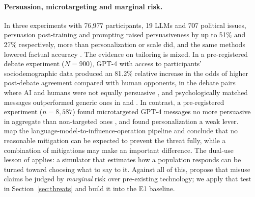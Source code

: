 \documentclass[11pt]{article}
\begin{document}
\paragraph{Persuasion, microtargeting and marginal risk.} In three experiments with 76,977 participants, 19 LLMs and 707 political issues, persuasion post-training and prompting raised persuasiveness by up to 51\% and 27\% respectively, more than personalization or scale did, and the same methods lowered factual accuracy \citep{hackenburg2025levers}. The evidence on tailoring is mixed. In a pre-registered debate experiment ($N=900$), GPT-4 with access to participants' sociodemographic data produced an 81.2\% relative increase in the odds of higher post-debate agreement compared with human opponents, in the debate pairs where AI and humans were not equally persuasive \citep{salvi2024persuasiveness}, and psychologically matched messages outperformed generic ones in \citet{matz2024personalized} and \citet{simchon2024microtargeting}. In contrast, a pre-registered experiment ($n=8{,}587$) found microtargeted GPT-4 messages no more persuasive in aggregate than non-targeted ones \citep{hackenburg2024microtargeting}, and \citet{hackenburg2025levers} found personalization a weak lever. \citet{goldstein2023influence} map the language-model-to-influence-operation pipeline and conclude that no reasonable mitigation can be expected to prevent the threat fully, while a combination of mitigations may make an important difference. The dual-use lesson of \citet{urbina2022dualuse} applies: a simulator that estimates how a population responds can be turned toward choosing what to say to it. Against all of this, \citet{kapoor2024open} propose that misuse claims be judged by \emph{marginal} risk over pre-existing technology; we apply that test in Section~\ref{sec:threats} and build it into the E1 baseline.
\end{document}
